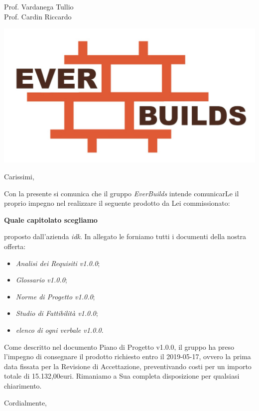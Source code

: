 \documentclass[12pt]{letter}
\date{14 Gennaio 2021}
\begin{document}
\begin{letter}
{
	Prof. Vardanega Tullio \\
 	Prof. Cardin Riccardo
}


\includegraphics[scale=0.17]{images/logo.png}

\opening{Carissimi,}

Con la presente si comunica che il gruppo
\textit{EverBuilds} intende comunicarLe il proprio 
impegno nel realizzare il seguente prodotto da Lei
commissionato:

\textbf{Quale capitolato scegliamo}

proposto dall'azienda \textit{idk}. In allegato 
le forniamo tutti i documenti della nostra offerta:

\begin{itemize}
	\item \textit{Analisi dei Requisiti v1.0.0};
	\item \textit{Glossario v1.0.0};
	\item \textit{Norme di Progetto v1.0.0};
	\item \textit{Studio di Fattibilità v1.0.0};
	\item \textit{elenco di ogni verbale v1.0.0}.
\end{itemize}

\newpage

Come descritto nel documento Piano di Progetto v1.0.0,
il gruppo ha preso l'impegno di consegnare il
prodotto richiesto entro il 2019-05-17, ovvero la prima data fissata per la Revisione di Accettazione, preventivando costi per un importo totale di 15.132,00euri. Rimaniamo a Sua completa disposizione per qualsiasi chiarimento.


\closing{Cordialmente,}

\end{letter}
\end{document}
